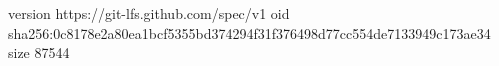 version https://git-lfs.github.com/spec/v1
oid sha256:0c8178e2a80ea1bcf5355bd374294f31f376498d77cc554de7133949c173ae34
size 87544

